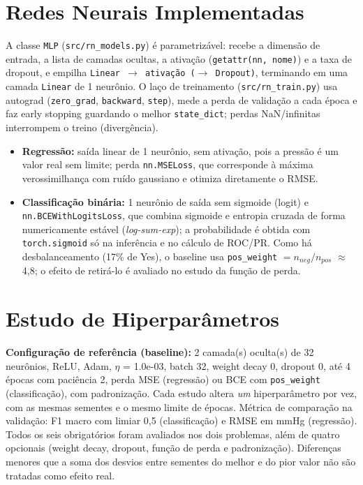 \documentclass[11pt,a4paper]{article}
\begin{document}
\section{Redes Neurais Implementadas}
A classe \texttt{MLP} (\texttt{src/rn\_models.py}) é parametrizável: recebe a dimensão de entrada, a lista de camadas ocultas, a
ativação (\texttt{getattr(nn, nome)}) e a taxa de dropout, e empilha \texttt{Linear $\to$ ativação ($\to$ Dropout)}, terminando
em uma camada \texttt{Linear} de 1 neurônio. O laço de treinamento (\texttt{src/rn\_train.py}) usa autograd
(\texttt{zero\_grad}, \texttt{backward}, \texttt{step}), mede a perda de validação a cada época e faz early stopping guardando o melhor
\texttt{state\_dict}; perdas NaN/infinitas interrompem o treino (divergência).
\begin{itemize}
\item \textbf{Regressão:} saída linear de 1 neurônio, sem ativação, pois a pressão é um valor real sem limite; perda
\texttt{nn.MSELoss}, que corresponde à máxima verossimilhança com ruído gaussiano e otimiza diretamente o RMSE.
\item \textbf{Classificação binária:} 1 neurônio de saída sem sigmoide (logit) e \texttt{nn.BCEWithLogitsLoss}, que combina sigmoide
e entropia cruzada de forma numericamente estável (\emph{log-sum-exp}); a probabilidade é obtida com \texttt{torch.sigmoid} só na
inferência e no cálculo de ROC/PR. Como há desbalanceamento (17\% de Yes), o baseline usa \texttt{pos\_weight} $= n_{neg}/n_{pos}$
$\approx$ 4,8; o efeito de retirá-lo é avaliado no estudo da função de perda.
\end{itemize}

\section{Estudo de Hiperparâmetros}\label{sec:hp}
\textbf{Configuração de referência (baseline):} 2 camada(s) oculta(s) de 32 neurônios, ReLU, Adam, $\eta$ = 1.0e-03, batch 32, weight decay 0, dropout 0, até 4 épocas com paciência 2, perda MSE (regressão) ou BCE com \texttt{pos\_weight} (classificação),
com padronização. Cada estudo altera \emph{um} hiperparâmetro por vez, com as mesmas sementes e o mesmo limite de épocas.
Métrica de comparação na validação: F1 macro com limiar 0,5 (classificação) e RMSE em mmHg (regressão). Todos os seis obrigatórios
foram avaliados nos dois problemas, além de quatro opcionais (weight decay, dropout, função de perda e padronização).
Diferenças menores que a soma dos desvios entre sementes do melhor e do pior valor não são tratadas como efeito real.
\end{document}
